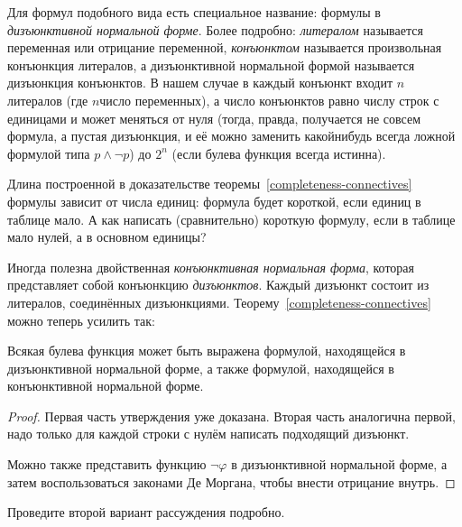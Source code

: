 Для формул подобного вида есть специальное название: формулы в
\emph{дизъюнктивной нормальной форме}.%
%
Более подробно:
\emph{литералом}%
называется переменная или отрицание переменной,
\emph{конъюнктом}%
называется произвольная конъюнкция литералов,
а дизъюнктивной нормальной формой называется дизъюнкция
конъюнктов. В нашем случае в каждый конъюнкт входит $n$
литералов (где $n$\т число переменных), а число конъюнктов
равно числу строк с единицами и может меняться от нуля
(тогда, правда, получается не совсем формула, а  пустая
дизъюнкция, и её можно заменить какой\д нибудь всегда ложной
формулой типа $p\land \lnot p$) до $2^n$ (если булева функция
всегда истинна).

\begin{problem}
Длина построенной в доказательстве
теоремы~\ref{completeness-connectives} формулы зависит от числа
единиц: формула будет короткой, если единиц в таблице мало. А
как написать (сравнительно) короткую формулу, если в таблице
мало нулей, а в основном единицы?
\end{problem}

Иногда полезна двойственная \emph{конъюнктивная нормальная форма},%
%
которая представляет собой конъюнкцию \emph{дизъюнктов}.%
Каждый дизъюнкт состоит из литералов, соединённых дизъюнкциями.
Теорему~\ref{completeness-connectives} можно теперь усилить
так:

\begin{theorem}
        \label{dnf-cnf}
Всякая булева функция может быть выражена формулой, находящейся
в дизъюнктивной нормальной форме, а также формулой, находящейся
в конъюнктивной нормальной форме.
\end{theorem}

\begin{proof}
Первая часть утверждения уже доказана. Вторая часть
аналогична первой, надо только для каждой строки с нулём написать
подходящий дизъюнкт.

Можно также представить функцию $\lnot \varphi$ в дизъюнктивной
нормальной форме, а затем воспользоваться законами Де Моргана,%
чтобы внести отрицание внутрь.
\end{proof}

\begin{problem}
Проведите второй вариант рассуждения подробно.
\end{problem}

